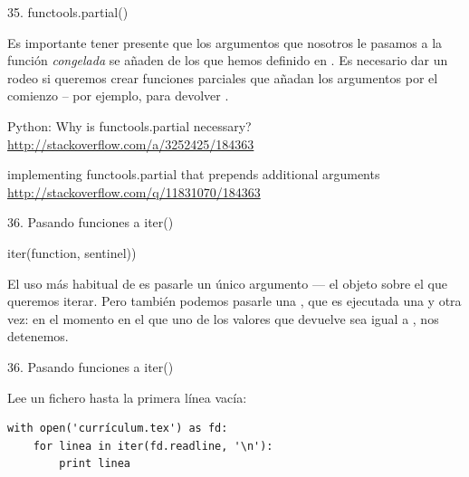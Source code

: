 \documentclass[14pt]{beamer}
\begin{document}
\begin{frame}[fragile]{35. functools.partial()}
  \small
  \begin{alertblock}{}
    \centering
    Es importante tener presente que los argumentos que nosotros le
    pasamos a la función \emph{congelada} se añaden
     de los que hemos definido en
    . Es necesario dar un rodeo si queremos crear
    funciones parciales que añadan los argumentos por el comienzo --
    por ejemplo, para devolver .
  \end{alertblock}

  \begin{block}
    {\centering Python: Why is functools.partial necessary?}
    \centering \url{http://stackoverflow.com/a/3252425/184363}
  \end{block}

  \begin{block}
    {\centering implementing functools.partial that prepends additional arguments}
    \centering \url{http://stackoverflow.com/q/11831070/184363}
  \end{block}
\end{frame}

\begin{frame}[fragile]{36. Pasando funciones a iter()}
  \begin{block}{}
    \Large
    \centering iter(function, sentinel))
  \end{block}

  \small
  \begin{alertblock}{}
    \centering
    El uso más habitual de  es pasarle un único
    argumento --- el objeto sobre el que queremos iterar. Pero también
    podemos pasarle una , que es ejecutada una y
    otra vez: en el momento en el que uno de los valores que devuelve
    sea igual a , nos detenemos.
  \end{alertblock}
\end{frame}

\begin{frame}[fragile]{36. Pasando funciones a iter()}
  \small
  \begin{exampleblock}
    {Lee un fichero hasta la primera línea vacía:}
    \begin{lstlisting}
with open('currículum.tex') as fd:
    for linea in iter(fd.readline, '\n'):
        print linea
    \end{lstlisting}
  \end{exampleblock}
\end{frame}
\end{document}
